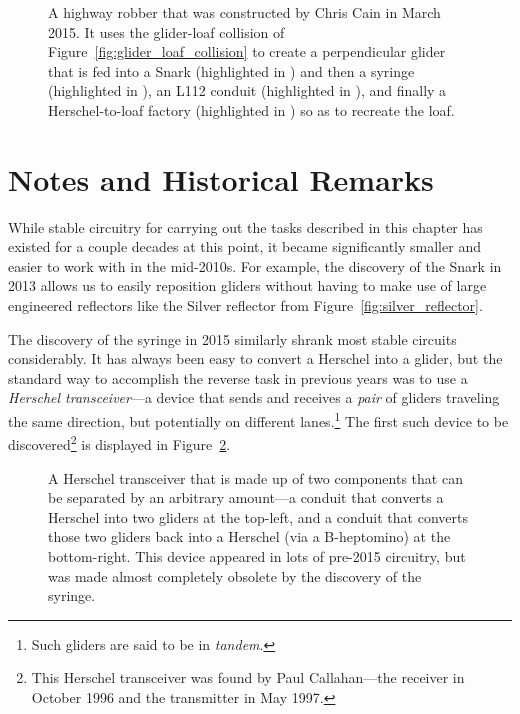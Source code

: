 \begin{figure}[!htb]
	\centering
	\caption{A highway robber that was constructed by Chris Cain in March 2015. It uses the glider-loaf collision of Figure~\ref{fig:glider_loaf_collision} to create a perpendicular glider that is fed into a Snark (highlighted in ) and then a syringe (highlighted in ), an L112 conduit (highlighted in ), and finally a Herschel-to-loaf factory (highlighted in ) so as to recreate the loaf.}
	\label{fig:highway_robber}
\end{figure}




\section*{Notes and Historical Remarks}
\label{sec:stable_circuits_notes}

While stable circuitry for carrying out the tasks described in this chapter has existed for a couple decades at this point, it became significantly smaller and easier to work with in the mid-2010s. For example, the discovery of the Snark in 2013 allows us to easily reposition gliders without having to make use of large engineered reflectors like the Silver reflector from Figure~\ref{fig:silver_reflector}.

The discovery of the syringe in 2015 similarly shrank most stable circuits considerably. It has always been easy to convert a Herschel into a glider, but the standard way to accomplish the reverse task in previous years was to use a \emph{Herschel transceiver}---a device that sends and receives a \emph{pair} of gliders traveling the same direction, but potentially on different lanes.\footnote{Such gliders are said to be in \emph{tandem}.} The first such device to be discovered\footnote{This Herschel transceiver was found by Paul Callahan---the receiver in October 1996 and the transmitter in May 1997.} is displayed in Figure~\ref{fig:herschel_transceiver}.

\begin{figure}[!htb]
	\centering
	\caption{A Herschel transceiver that is made up of two components that can be separated by an arbitrary amount---a conduit that converts a Herschel into two gliders at the top-left, and a conduit that converts those two gliders back into a Herschel (via a B-heptomino) at the bottom-right. This device appeared in lots of pre-2015 circuitry, but was made almost completely obsolete by the discovery of the syringe.}
	\label{fig:herschel_transceiver}
\end{figure}

